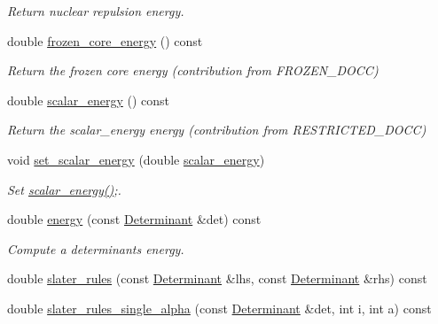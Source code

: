 \begin{DoxyCompactItemize}
\begin{DoxyCompactList}\small\item\em Return nuclear repulsion energy. \end{DoxyCompactList}\item 
double \mbox{\hyperlink{classforte_1_1_active_space_integrals_a8481b2cb3f2bc4b44984da170724cb72}{frozen\+\_\+core\+\_\+energy}} () const
\begin{DoxyCompactList}\small\item\em Return the frozen core energy (contribution from F\+R\+O\+Z\+E\+N\+\_\+\+D\+O\+CC) \end{DoxyCompactList}\item 
double \mbox{\hyperlink{classforte_1_1_active_space_integrals_ad75d3daa2e4a1d78b4dc0ffb5f60c80e}{scalar\+\_\+energy}} () const
\begin{DoxyCompactList}\small\item\em Return the scalar\+\_\+energy energy (contribution from R\+E\+S\+T\+R\+I\+C\+T\+E\+D\+\_\+\+D\+O\+CC) \end{DoxyCompactList}\item 
void \mbox{\hyperlink{classforte_1_1_active_space_integrals_a456ae6c8d7df86829519b265b728ff49}{set\+\_\+scalar\+\_\+energy}} (double \mbox{\hyperlink{classforte_1_1_active_space_integrals_ad75d3daa2e4a1d78b4dc0ffb5f60c80e}{scalar\+\_\+energy}})
\begin{DoxyCompactList}\small\item\em Set \mbox{\hyperlink{classforte_1_1_active_space_integrals_ad75d3daa2e4a1d78b4dc0ffb5f60c80e}{scalar\+\_\+energy()}};. \end{DoxyCompactList}\item 
double \mbox{\hyperlink{classforte_1_1_active_space_integrals_a3b5853b2d617be385a5ffa89cc50ebc9}{energy}} (const \mbox{\hyperlink{namespaceforte_a2076c63fd7b8732004d9e1442ce527c1}{Determinant}} \&det) const
\begin{DoxyCompactList}\small\item\em Compute a determinant\textquotesingle{}s energy. \end{DoxyCompactList}\item 
double \mbox{\hyperlink{classforte_1_1_active_space_integrals_ae371fb9c622fd81006f20ed257853527}{slater\+\_\+rules}} (const \mbox{\hyperlink{namespaceforte_a2076c63fd7b8732004d9e1442ce527c1}{Determinant}} \&lhs, const \mbox{\hyperlink{namespaceforte_a2076c63fd7b8732004d9e1442ce527c1}{Determinant}} \&rhs) const
\item 
double \mbox{\hyperlink{classforte_1_1_active_space_integrals_a2b03f0580818ada3774a48366057bfdf}{slater\+\_\+rules\+\_\+single\+\_\+alpha}} (const \mbox{\hyperlink{namespaceforte_a2076c63fd7b8732004d9e1442ce527c1}{Determinant}} \&det, int i, int a) const

\end{DoxyCompactItemize}
